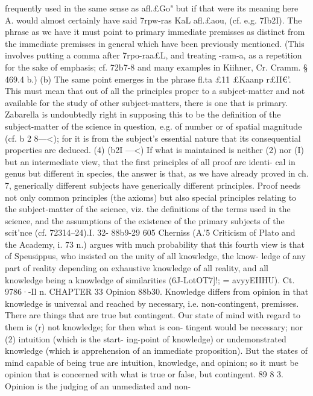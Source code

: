 {{{{{{{{{{{{{{{{{{{{{{{{{{{{{{{{{{{{{{{{{frequently used in the same sense as afl.£Go" but if that were its
meaning here A. would almost certainly have said 7rpw-ras
KaL afl.£aou, (cf. e.g. 7Ib2I). The phrase as wc have it must point
to primary immediate premisses as distinct from the immediate
premisses in general which have been previously mentioned.
(This involves putting a comma after 7rpo-raa£L, and treating
-ram-a, as a repetition for the sake of emphasis; cf. 72b7-8 and
many examples in Kiihner, Cr. Cramm. § 469.4 b.) (b) The same
point emerges in the phrase fl.ta £11 £Kaanp r£II€'. This must mean
that out of all the principles proper to a subject-matter and not
available for the study of other subject-matters, there is one that
is primary. Zabarella is undoubtedly right in supposing this to
be the definition of the subject-matter of the science in question,
e.g. of number or of spatial magnitude (cf. b 2 8---<}); for it is from
the subject's essential nature that its consequential properties
are deduced.
(4) (b2I ---<}) If what is maintained is neither (2) nor (I) but an
intermediate view, that the first principles of all proof are identi-
cal in genus but different in species, the answer is that, as we
have already proved in ch. 7, generically different subjects have
generically different principles. Proof needs not only common
principles (the axioms) but also special principles relating to the
subject-matter of the science, viz. the definitions of the terms
used in the science, and the assumptions of the existence of the
primary subjects of the scit'nce (cf. 72314--24).I. 32- 88b9-29
605
Cherniss (A.'5 Criticism of Plato and the Academy, i. 73 n.)
argues with much probability that this fourth view is that of
Speusippus, who insisted on the unity of all knowledge, the know-
ledge of any part of reality depending on exhaustive knowledge
of all reality, and all knowledge being a knowledge of similarities
(6J-LotOT7]!; = avyyEIIHU). Ct. 9786·-Il n.
CHAPTER 33
Opinion
88b30. Knowledge differs from opinion in that knowledge is
universal and reached by necessary, i.e. non-contingent, premisses.
There are things that are true but contingent. Our state of mind
with regard to them is (r) not knowledge; for then what is con-
tingent would be necessary; nor (2) intuition (which is the start-
ing-point of knowledge) or undemonstrated knowledge (which is
apprehension of an immediate proposition). But the states of
mind capable of being true are intuition, knowledge, and opinion;
so it must be opinion that is concerned with what is true or false,
but contingent.
89 8 3. Opinion is the judging of an unmediated and non-
}}}}}}}}}}}}}}}}}}}}}}}}}}}}}}}}}}}}}}}
